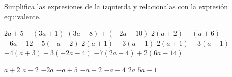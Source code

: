 Simplifica las expresiones de la izquierda y relacionalas con la expresión equivalente.

\begin{multicols}{2}
    \begin{flushright}
        \begin{choices}
            \choice $2a+5 - (3a+1)$
            \choice $(3a-8)+(-2a+10)$
            \choice $2(a+2)-(a+6)$
            \choice $-6a-12-5(-a-2)$
            \choice $2(a+1)+3(a-1)$
            \choice $2(a+1)-3(a-1)$
            \choice $-4(a+3)-3(-2a-4)$
            \choice $-7(2a-4)+2(6a-14)$
        \end{choices}
    \end{flushright}

    \columnbreak

    \begin{parts}
        \fillin[B][1cm] $a+2$
        \fillin[C][1cm] $a-2$
        \fillin[H][1cm] $-2a$
        \fillin[F][1cm] $-a+5$
        \fillin[D][1cm] $-a-2$
        \fillin[A][1cm] $-a+4$
        \fillin[G][1cm] $2a$
        \fillin[E][1cm] $5a-1$
    \end{parts}
\end{multicols}
